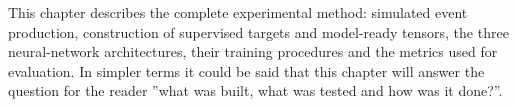 



This chapter describes the complete experimental method: simulated event
production, construction of supervised targets and model-ready tensors, the
three neural-network architectures, their training procedures and the metrics
used for evaluation. 
In simpler terms it could be said that this chapter will answer the question for the reader ''what was built, what was tested and how was it done?''. 


